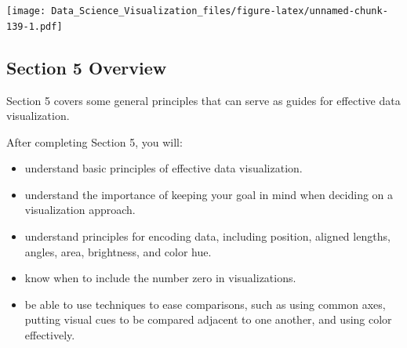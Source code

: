 \documentclass[
]{article}
\newenvironment{Shaded}{\begin{snugshade}}{\end{snugshade}}
\newcommand{\DataTypeTok}[1]{\textcolor[rgb]{0.13,0.29,0.53}{#1}}
\newcommand{\DecValTok}[1]{\textcolor[rgb]{0.00,0.00,0.81}{#1}}
\newcommand{\KeywordTok}[1]{\textcolor[rgb]{0.13,0.29,0.53}{\textbf{#1}}}
\newcommand{\NormalTok}[1]{#1}
\newcommand{\OperatorTok}[1]{\textcolor[rgb]{0.81,0.36,0.00}{\textbf{#1}}}
\newcommand{\StringTok}[1]{\textcolor[rgb]{0.31,0.60,0.02}{#1}}
\providecommand{\tightlist}{%
  \setlength{\itemsep}{0pt}\setlength{\parskip}{0pt}}
\begin{document}
\begin{Shaded}
\end{Shaded}

\texttt{[image: Data\_Science\_Visualization\_files/figure-latex/unnamed-chunk-139-1.pdf]}

\hypertarget{section-5-overview}{%
\subsection{Section 5 Overview}\label{section-5-overview}}

Section 5 covers some general principles that can serve as guides for
effective data visualization.

After completing Section 5, you will:

\begin{itemize}
\tightlist
\item
  understand basic principles of effective data visualization.
\item
  understand the importance of keeping your goal in mind when deciding
  on a visualization approach.
\item
  understand principles for encoding data, including position, aligned
  lengths, angles, area, brightness, and color hue.
\item
  know when to include the number zero in visualizations.
\item
  be able to use techniques to ease comparisons, such as using common
  axes, putting visual cues to be compared adjacent to one another, and
  using color effectively.
\end{itemize}
\end{document}
